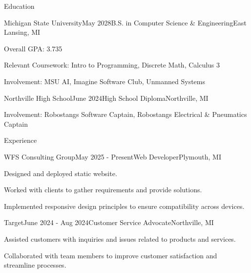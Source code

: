 \documentclass[
	11pt
]{resume}
\begin{document}
	\begin{rSection}{Education}
		\begin{rSectionEntry}{Michigan State University}{May 2028}{B.S. in Computer Science \& Engineering}{East Lansing, MI}
			\item Overall GPA: 3.735
			\item Relevant Coursework: Intro to Programming, Discrete Math, Calculus 3
			\item Involvement: MSU AI, Imagine Software Club, Unmanned Systems
		\end{rSectionEntry}

		\begin{rSectionEntry}{Northville High School}{June 2024}{High School Diploma}{Northville, MI}
			\item Involvement: Robostangs Software Captain, Robostangs Electrical \& Pneumatics Captain
		\end{rSectionEntry}

	\end{rSection}

	\begin{rSection}{Experience}

		\begin{rSectionEntry}{WFS Consulting Group}{May 2025 - Present}{Web Developer}{Plymouth, MI}
			\item Designed and deployed static website.
			\item Worked with clients to gather requirements and provide solutions.
			\item Implemented responsive design principles to ensure compatibility across devices.
		\end{rSectionEntry}

		\begin{rSectionEntry}{Target}{June 2024 - Aug 2024}{Customer Service Advocate}{Northville, MI}
			\item Assisted customers with inquiries and issues related to products and services.
			\item Collaborated with team members to improve customer satisfaction and streamline processes.
		\end{rSectionEntry}

	\end{rSection}
\end{document}
